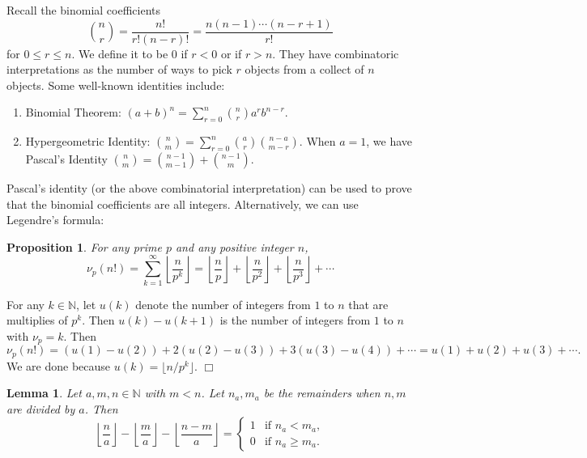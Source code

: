 \documentclass{article}
\def\N{{\mathbb N}}
\newtheorem{lemma}[subsection]{Lemma}
\newtheorem{proposition}[subsection]{Proposition}
\newenvironment{proof}{\noindent {\bf Proof:}}{$\Box$ \vspace{2 ex}}
\begin{document}
Recall the binomial coefficients
$$\binom{n}{r} = \frac{n!}{r!(n-r)!} = \frac{n(n-1)\cdots(n-r+1)}{r!}$$
for $0\leq r\leq n$. We define it to be $0$ if $r<0$ or if $r>n$. They have combinatoric interpretations as the number of ways to pick $r$ objects from a collect of $n$ objects. Some well-known identities include:
\begin{enumerate}
    \item Binomial Theorem: $\displaystyle (a+b)^n = \sum_{r=0}^n \binom{n}{r}a^rb^{n-r}$.
    \item Hypergeometric Identity: $\displaystyle \binom{n}{m} = \sum_{r=0}^n \binom{a}{r}\binom{n-a}{m-r}.$ When $a=1$, we have Pascal's Identity $\displaystyle \binom{n}{m} = \binom{n-1}{m-1} + \binom{n-1}{m}.$
\end{enumerate}
Pascal's identity (or the above combinatorial interpretation) can be used to prove that the binomial coefficients are all integers. Alternatively, we can use Legendre's formula:

\begin{proposition}
    For any prime $p$ and any positive integer $n$,
    $$\nu_p(n!) = \sum_{k=1}^\infty \left\lfloor\frac{n}{p^k}\right\rfloor = \left\lfloor\frac{n}{p}\right\rfloor + \left\lfloor\frac{n}{p^2}\right\rfloor + \left\lfloor\frac{n}{p^3}\right\rfloor + \cdots$$
\end{proposition}

\begin{proof}
    For any $k\in\N$, let $u(k)$ denote the number of integers from $1$ to $n$ that are multiplies of $p^k$. Then $u(k) - u(k+1)$ is the number of integers from $1$ to $n$ with $\nu_p = k$. Then
    $$\nu_p(n!) = (u(1)-u(2)) + 2(u(2)-u(3)) + 3(u(3)-u(4)) + \cdots = u(1) + u(2) + u(3) + \cdots.$$
    We are done because $u(k) = \lfloor n/p^k\rfloor.$
\end{proof}

\begin{lemma}\label{lem:ind}
    Let $a,m,n\in\N$ with $m < n$. Let $n_a,m_a$ be the remainders when $n,m$ are divided by $a$. Then
    $$\left\lfloor\frac{n}{a}\right\rfloor - \left\lfloor\frac{m}{a}\right\rfloor - \left\lfloor\frac{n-m}{a}\right\rfloor = \begin{cases}
        1&\mbox{if }n_a < m_a,\\
        0&\mbox{if }n_a\geq m_a.
    \end{cases}$$
\end{lemma}
\end{document}
